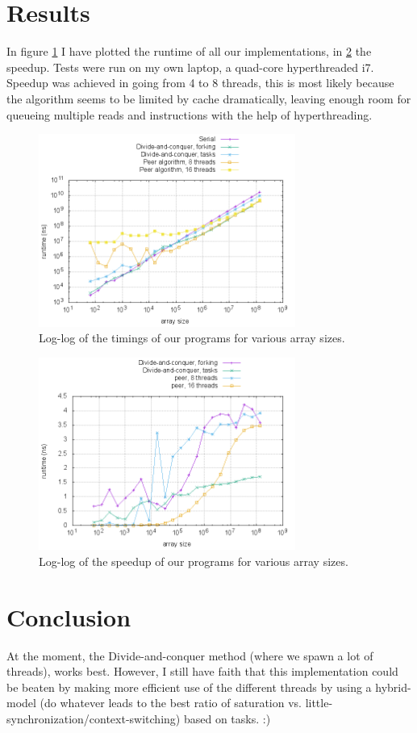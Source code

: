 \section{Results}
  In figure \ref{timings} I have plotted the runtime of all our implementations, in \ref{speedup} the speedup.
  Tests were run on my own laptop, a quad-core hyperthreaded i7. Speedup was achieved in going from 4 to 8 threads, this is most likely because the algorithm
  seems to be limited by cache dramatically, leaving enough room for queueing multiple reads and instructions with the help of hyperthreading.
  \begin{figure}[h!]
  \centering
    \includegraphics[width=0.75\textwidth]{plots/timings.png}
  \caption{Log-log of the timings of our programs for various array sizes.}
  \label{timings}
  \end{figure}

  \begin{figure}[h!]
  \centering
    \includegraphics[width=0.75\textwidth]{plots/speedup.png}
  \caption{Log-log of the speedup of our programs for various array sizes.}
  \label{speedup}
  \end{figure}

\section{Conclusion}
  At the moment, the Divide-and-conquer method (where we spawn a lot of threads), works best.
  However, I still have faith that this implementation could be beaten by making more efficient use of the different threads by using a hybrid-model (do whatever leads to the best ratio of saturation vs. little-synchronization/context-switching) based on tasks. :)

